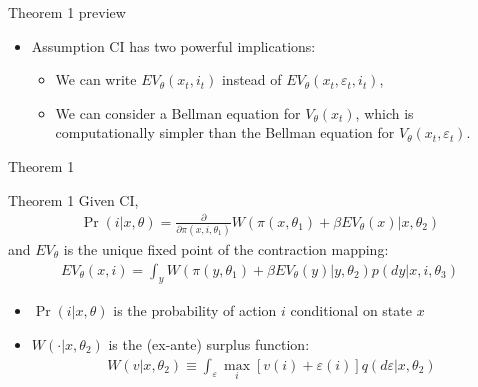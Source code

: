 \documentclass[aspectratio=169,11pt]{beamer}
\begin{document}
\begin{frame}{Theorem 1 preview}
\begin{itemize}
	\item Assumption CI has two powerful implications:
	\begin{itemize}
		\medskip
		\item We can write $ EV_{\theta}\left(x_{t},i_{t}\right)$ instead of $EV_{\theta}\left(x_{t},\varepsilon_{t},i_{t}\right)$,
		\medskip
		\item We can consider a Bellman equation for $ V_{\theta}\left(x_{t}\right)$, which is computationally simpler than
		the Bellman equation for $V_{\theta}\left(x_{t},\varepsilon_{t}\right) $.
	\end{itemize}
\end{itemize}
\end{frame}

\begin{frame}{Theorem 1}
\footnotesize
\begin{block}{Theorem 1}
Given CI,
\begin{align*}
	\Pr\left(i|x,\theta\right) = \frac{\partial}{\partial \pi \left(x,i,\theta_{1}\right)} W\left( \pi \left(x,\theta_{1}\right) +\beta EV_{\theta}\left(x\right) |x,\theta_{2}\right)
\end{align*}
and  $EV_{\theta}$ is the unique fixed point of the contraction mapping:
\begin{align*} 
	EV_{\theta}\left(x,i\right) = \int_{y} W\left(\pi \left(y,\theta_{1}\right)+
	\beta EV_{\theta}\left(y\right)|y,\theta_{2}\right)
	p\left(dy|x,i,\theta_{3}\right)
\end{align*}
\begin{itemize}
	\item $\Pr\left(i|x,\theta\right)$ is the probability of action $i$ conditional on state $x$
	\item $W\left( \cdot |x,\theta_{2}\right)$ is the (ex-ante) surplus function: 
	\begin{align*}
	W\left(v |x,\theta_{2}\right) \equiv \int_{\varepsilon}  \max_{i} \left[v\left( i \right) +\varepsilon\left( i \right)\right] 
	q\left(d\varepsilon|x,\theta_{2}\right)	
	\end{align*}
\end{itemize}
\end{block}
\end{frame}
\end{document}
